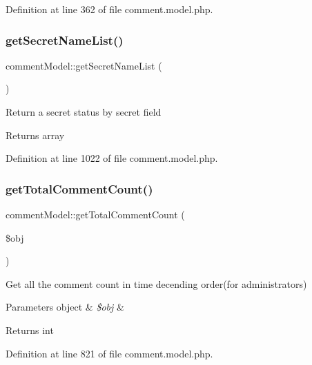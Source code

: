 Definition at line 362 of file comment.\+model.\+php.

\hypertarget{classcommentModel_ad05dafe1e96d761873a0b772eb1f749a}{}\label{classcommentModel_ad05dafe1e96d761873a0b772eb1f749a} 
\subsubsection{\texorpdfstring{get\+Secret\+Name\+List()}{getSecretNameList()}}
{\footnotesize\ttfamily comment\+Model\+::get\+Secret\+Name\+List (\begin{DoxyParamCaption}{ }\end{DoxyParamCaption})}

Return a secret status by secret field \begin{DoxyReturn}{Returns}
array 
\end{DoxyReturn}


Definition at line 1022 of file comment.\+model.\+php.

\hypertarget{classcommentModel_a1854f15efa75a16e2edd603167d05e93}{}\label{classcommentModel_a1854f15efa75a16e2edd603167d05e93} 
\subsubsection{\texorpdfstring{get\+Total\+Comment\+Count()}{getTotalCommentCount()}}
{\footnotesize\ttfamily comment\+Model\+::get\+Total\+Comment\+Count (\begin{DoxyParamCaption}\item[{}]{\$obj }\end{DoxyParamCaption})}

Get all the comment count in time decending order(for administrators) 
\begin{DoxyParams}[1]{Parameters}
object & {\em \$obj} & \\
\hline
\end{DoxyParams}
\begin{DoxyReturn}{Returns}
int 
\end{DoxyReturn}


Definition at line 821 of file comment.\+model.\+php.

\hypertarget{classcommentModel_abaac356ea7a0b2720034646c45b567ec}{}\label{classcommentModel_abaac356ea7a0b2720034646c45b567ec} 
